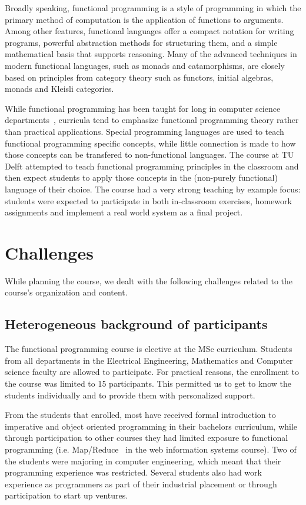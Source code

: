 \documentclass[conference]{IEEEtran}
\begin{document}
Broadly speaking, functional programming is a style of programming in which the
primary method of computation is the application of functions to arguments.
Among other features, functional languages offer a compact notation for writing
programs, powerful abstraction methods for structuring them, and a simple
mathematical basis that supports reasoning. Many of the advanced techniques in
modern functional languages, such as monads and catamorphisms, are closely based
on principles from category theory such as functors, initial algebras, monads
and Kleisli categories.

While functional programming has been taught for long in computer science
departments~\cite{Joost93}, curricula tend to emphasize functional programming
theory rather than practical applications. Special programming languages are
used to teach functional programming specific concepts, while little connection
is made to how those concepts can be transfered to non-functional languages.
The course at TU Delft attempted to teach functional programming principles in the
classroom and then expect students to apply those concepts in the (non-purely
functional) language of their choice. The course had a very strong teaching by
example focus: students were expected to participate in both in-classroom
exercises, homework assignments and implement a real world system as a final
project.

\section{Challenges}

While planning the course, we dealt with the following challenges related
to the course's organization and content.

\subsection{Heterogeneous background of participants}

The functional programming course is elective at the MSc curriculum. Students
from all departments in the Electrical Engineering, Mathematics and Computer
science faculty are allowed to participate. For practical reasons, the
enrollment to the course was limited to 15 participants. This permitted
us to get to know the students individually and to provide them with
personalized support.

From the students that enrolled, most have received formal introduction to
imperative and object oriented programming in their bachelors curriculum, while
through participation to other courses they had limited exposure to functional
programming (i.e. Map/Reduce~\cite{Dean04} in the web information systems
course). Two of the students were majoring in computer engineering, which meant
that their programming experience was restricted. Several students also had work
experience as programmers as part of their industrial placement or through
participation to start up ventures.
\end{document}
